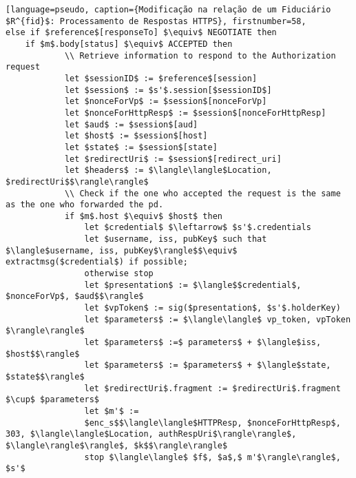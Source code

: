 

\begin{lstlisting}[language=pseudo, caption={Modificação na relação de um Fiduciário $R^{fid}$: Processamento de Respostas HTTPS}, firstnumber=58, 
else if $reference$[responseTo] $\equiv$ NEGOTIATE then
    if $m$.body[status] $\equiv$ ACCEPTED then
            \\ Retrieve information to respond to the Authorization request
            let $sessionID$ := $reference$[session]
            let $session$ := $s'$.session[$sessionID$]
            let $nonceForVp$ := $session$[nonceForVp]
            let $nonceForHttpResp$ := $session$[nonceForHttpResp]
            let $aud$ := $session$[aud]
            let $host$ := $session$[host]
            let $state$ := $session$[state]
            let $redirectUri$ := $session$[redirect_uri]
            let $headers$ := $\langle\langle$Location, $redirectUri$$\rangle\rangle$
            \\ Check if the one who accepted the request is the same as the one who forwarded the pd.
            if $m$.host $\equiv$ $host$ then
                let $credential$ $\leftarrow$ $s'$.credentials
                let $username, iss, pubKey$ such that $\langle$username, iss, pubKey$\rangle$$\equiv$ extractmsg($credential$) if possible; 
                otherwise stop
                let $presentation$ := $\langle$$credential$, $nonceForVp$, $aud$$\rangle$
                let $vpToken$ := sig($presentation$, $s'$.holderKey) 
                let $parameters$ := $\langle\langle$ vp_token, vpToken $\rangle\rangle$
                let $parameters$ :=$ parameters$ + $\langle$iss, $host$$\rangle$
                let $parameters$ := $parameters$ + $\langle$state, $state$$\rangle$
                let $redirectUri$.fragment := $redirectUri$.fragment $\cup$ $parameters$
                let $m'$ := 
                $enc_s$$\langle\langle$HTTPResp, $nonceForHttpResp$, 303, $\langle\langle$Location, authRespUri$\rangle\rangle$, $\langle\rangle$\rangle$, $k$$\rangle\rangle$
                stop $\langle\langle$ $f$, $a$,$ m'$\rangle\rangle$, $s'$
\end{lstlisting}



